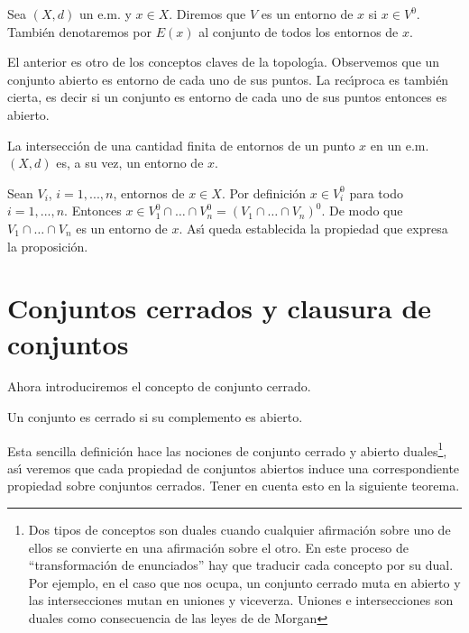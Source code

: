 \begin{definicion} Sea $(X,d)$ un e.m. y $x\in X$. Diremos que $V$
es un entorno de $x$ si $x\in V^0$. Tambi\'en denotaremos por
$E(x)$ al conjunto de todos los entornos de $x$.
\end{definicion}

El anterior es otro de los conceptos claves de la topolog\'{\i}a.
Observemos que un conjunto abierto es entorno de cada uno de sus
puntos. La rec\'{\i}proca es tambi\'en cierta, es decir si un
conjunto es entorno de cada uno de sus puntos entonces es abierto.

\begin{proposicion} La intersecci\'on de una cantidad finita de
entornos de un punto $x$ en un e.m. $(X,d)$ es, a su vez, un
entorno de $x$.
\end{proposicion}
\begin{demo} Sean $V_i$, $i=1,...,n$, entornos de $x\in X$. Por
definici\'on $x\in V_i^0$ para todo $i=1,...,n$. Entonces $x\in
V_1^0\cap\dots\cap V_n^0=(V_1\cap\dots\cap V_n)^0$. De modo que
$V_1\cap\dots\cap V_n$ es un entorno de $x$. As\'{\i} queda
establecida la propiedad que expresa la proposici\'on.
\end{demo}

\section{Conjuntos cerrados y clausura de
conjuntos}

Ahora introduciremos el concepto de conjunto cerrado.
\begin{definicion} Un conjunto es cerrado si su complemento es
abierto.
\end{definicion}

Esta sencilla definici\'on hace las nociones de conjunto cerrado y
abierto duales\footnote{Dos tipos de conceptos son duales cuando
cualquier afirmaci\'on sobre uno de ellos se convierte en una
afirmaci\'on sobre el otro. En este proceso de ``transformaci\'on
de enunciados'' hay que traducir cada concepto por su dual. Por
ejemplo, en el caso que nos ocupa, un conjunto cerrado muta en
abierto y las intersecciones mutan en uniones y viceverza. Uniones
e intersecciones son duales como consecuencia de las leyes de de
Morgan}, as\'{\i} veremos que cada propiedad de conjuntos abiertos
induce una correspondiente propiedad sobre conjuntos cerrados.
Tener en cuenta esto en la siguiente teorema.

